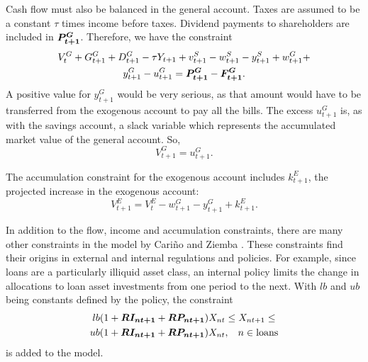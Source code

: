 Cash flow must also be balanced in the general account.  Taxes are assumed to be a constant $\tau$ times income before taxes.  Dividend payments to shareholders are included in $\mathbf{\boldsymbol{P^G_{t+1}}}$.  Therefore, we have the constraint
\begin{multline*}
V^G_t + G^G_{t+1} + D^G_{t+1} - \tau Y_{t+1} + v^S_{t+1} - w^S_{t+1} - y^S_{t+1} + w^G_{t+1} +\\
 y^G_{t+1} - u^G_{t+1} =\mathbf{\boldsymbol{P^G_{t+1}}} - \mathbf{\boldsymbol{F^G_{t+1}}}.
\end{multline*}
A positive value for $y^G_{t+1}$ would be very serious, as that amount would have to be transferred from the exogenous account to pay all the bills.  The excess $u^G_{t+1}$ is, as with the savings account, a slack variable which represents the accumulated market value of the general account.  So,
\begin{equation*}
V^G_{t+1} = u^G_{t+1}.
\end{equation*}

The accumulation constraint for the exogenous account includes $k^E_{t+1}$, the projected increase in the exogenous account:
\begin{equation*}
V^E_{t+1} = V^E_t - w^G_{t+1} - y^G_{t+1} + k^E_{t+1}.
\end{equation*}

In addition to the flow, income and accumulation constraints, there are many other constraints in the model by Cari\~{n}o and Ziemba \cite{carino98}.  These constraints find their origins in external and internal regulations and policies.  For example, since loans are a particularly illiquid asset class, an internal policy limits the change in allocations to loan asset investments from one period to the next.  With $lb$ and $ub$ being constants defined by the policy, the constraint
\begin{multline*}
lb(1+\mathbf{\boldsymbol{RI_{nt+1}}} + \mathbf{\boldsymbol{RP_{nt+1}}})X_{nt} \leq X_{nt+1} \leq\\
 ub(1+\mathbf{\boldsymbol{RI_{nt+1}}} + \mathbf{\boldsymbol{RP_{nt+1}}})X_{nt}, \hspace{3mm} n \in \mbox{loans}
\end{multline*}
is added to the model.


